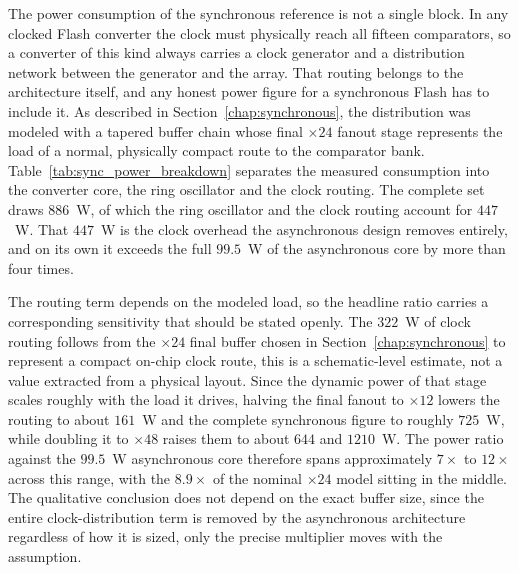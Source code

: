 The power consumption of the synchronous reference is not a single block. In any clocked Flash converter the clock must physically reach all fifteen comparators, so a converter of this kind always carries a clock generator and a distribution network between the generator and the array. That routing belongs to the architecture itself, and any honest power figure for a synchronous Flash has to include it. As described in Section~\ref{chap:synchronous}, the distribution was modeled with a tapered buffer chain whose final $\times 24$ fanout stage represents the load of a normal, physically compact route to the comparator bank. Table~\ref{tab:sync_power_breakdown} separates the measured consumption into the converter core, the ring oscillator and the clock routing. The complete set draws $886$~\textmu W, of which the ring oscillator and the clock routing account for $447$~\textmu W. That $447$~\textmu W is the clock overhead the asynchronous design removes entirely, and on its own it exceeds the full $99.5$~\textmu W of the asynchronous core by more than four times.

The routing term depends on the modeled load, so the headline ratio carries a corresponding sensitivity that should be stated openly. The $322$~\textmu W of clock routing follows from the $\times 24$ final buffer chosen in Section~\ref{chap:synchronous} to represent a compact on-chip clock route, this is a schematic-level estimate, not a value extracted from a physical layout. Since the dynamic power of that stage scales roughly with the load it drives, halving the final fanout to $\times 12$ lowers the routing to about $161$~\textmu W and the complete synchronous figure to roughly $725$~\textmu W, while doubling it to $\times 48$ raises them to about $644$ and $1210$~\textmu W. The power ratio against the $99.5$~\textmu W asynchronous core therefore spans approximately $7\times$ to $12\times$ across this range, with the $8.9\times$ of the nominal $\times 24$ model sitting in the middle. The qualitative conclusion does not depend on the exact buffer size, since the entire clock-distribution term is removed by the asynchronous architecture regardless of how it is sized, only the precise multiplier moves with the assumption.

